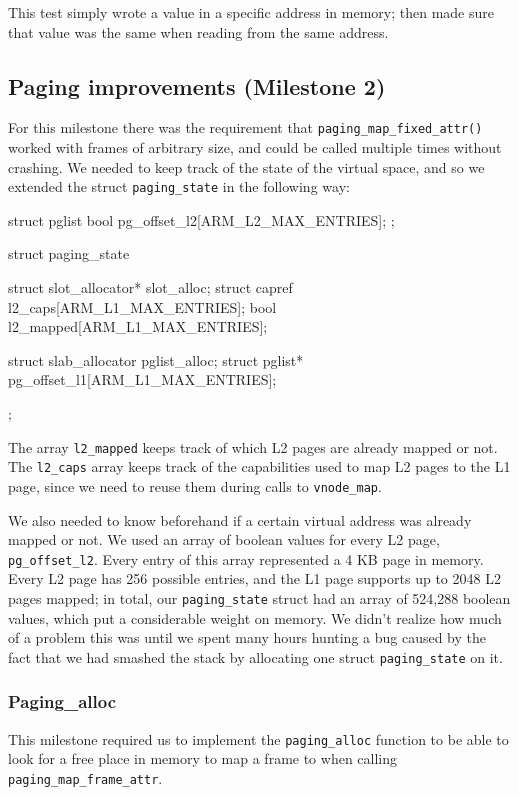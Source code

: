 \documentclass[a4paper,twoside,openright]{report}
\renewcommand{\t}[1]{%
	{\texttt{#1}}}
\begin{document}
This test simply wrote a value in a specific address in memory; then made sure that value
was the same when reading from the same address.

\subsection{Paging improvements (Milestone 2)}

For this milestone there was the requirement that \t{paging\_map\_fixed\_attr()} worked with frames of arbitrary size, and could be called multiple times without crashing. 
We needed to keep track of the state of the virtual space, and so we extended the struct \t{paging\_state} in the following way:

\begin{pandacode}
struct pglist {
	bool pg_offset_l2[ARM_L2_MAX_ENTRIES];
};

struct paging_state {
	struct slot_allocator* slot_alloc;
	struct capref l2_caps[ARM_L1_MAX_ENTRIES];
	bool l2_mapped[ARM_L1_MAX_ENTRIES];

	struct slab_allocator pglist_alloc;
	struct pglist* pg_offset_l1[ARM_L1_MAX_ENTRIES];
};
\end{pandacode}

The array \t{l2\_mapped} keeps track of which L2 pages are already mapped or not. 
The \t{l2\_caps} array keeps track of the capabilities used to map L2 pages to the L1 page, 
since we need to reuse them during calls to \t{vnode\_map}. 

We also needed to know beforehand if a certain virtual address was already
mapped or not. We used an array of boolean values for every L2 page,
\t{pg\_offset\_l2}. Every entry of this array represented a 4 KB page in
memory. Every L2 page has 256 possible entries, and the L1 page supports up to
2048 L2 pages mapped; in total, our \t{paging\_state} struct had an array of
524,288 boolean values, which put a considerable weight on memory. We didn't
realize how much of a problem this was until we spent many hours hunting a bug
caused by the fact that we had smashed the stack by allocating one struct
\t{paging\_state} on it.


\subsubsection{Paging\_alloc}

This milestone required us to implement the \t{paging\_alloc} function to be able to look
for a free place in memory to map a frame to when calling \t{paging\_map\_frame\_attr}.
\end{document}
